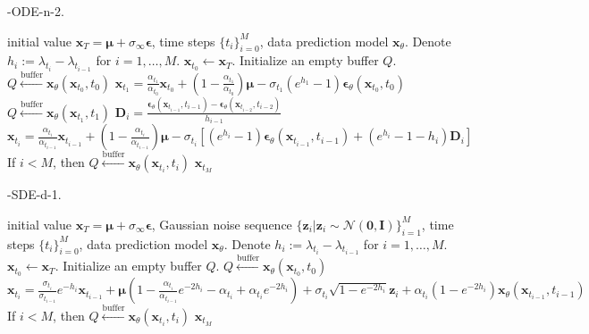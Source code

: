 \begin{algorithm}[H]
    \centering
    \caption{\ourmethod-ODE-n-2.}\label{alg:ode-n-2}
    \begin{algorithmic}[1]
    \REQUIRE initial value $\boldsymbol{x}_T=\boldsymbol\mu+\sigma_\infty\boldsymbol\epsilon$, time steps $\{t_i\}_{i=0}^M$, data prediction model $\boldsymbol{x}_\theta$. Denote $h_i:=\lambda_{t_i}-\lambda_{t_{i-1}}$ for $i=1,\ldots,M$.
        \STATE $\boldsymbol{x}_{t_0}\leftarrow\boldsymbol{x}_T$. Initialize an empty buffer $Q$.
        \STATE $Q\xleftarrow{\text{buffer}}\boldsymbol{x}_\theta(\boldsymbol{x}_{t_0},t_0)$
        \STATE $\boldsymbol{x}_{t_1}=\frac{\alpha_{t_1}}{\alpha_{t_{0}}}\boldsymbol{x}_{t_0}
        +\left(1-\frac{\alpha_{t_1}}{\alpha_{t_{0}}}\right)\boldsymbol{\mu}-\sigma_{t_1}(e^{h_1}-1)\boldsymbol{\epsilon}_\theta(\boldsymbol{x}_{t_0},t_0)$
        \STATE $Q\xleftarrow{\text{buffer}}\boldsymbol{x}_\theta(\boldsymbol{x}_{t_1},t_1)$
        \STATE $\boldsymbol{D}_i=\frac{\boldsymbol{\epsilon}_\theta(\boldsymbol{x}_{t_{i-1}},t_{i-1})-\boldsymbol{\epsilon}_\theta(\boldsymbol{x}_{t_{i-2}},t_{i-2})}{h_{i-1}}$
        \STATE $\boldsymbol{x}_{t_{i}}=\frac{\alpha_{t_i}}{\alpha_{t_{i-1}}}\boldsymbol{x}_{t_{i-1}}
        +\left(1-\frac{\alpha_{t_i}}{\alpha_{t_{i-1}}}\right)\boldsymbol{\mu}-\sigma_{t_i}\left[(e^{h_i}-1)\boldsymbol{\epsilon}_\theta(\boldsymbol{x}_{t_{i-1}},t_{i-1})+(e^{h_i}-1-h_i)\boldsymbol{D}_i \right]$
        \STATE If $i < M$, then $Q \xleftarrow{\text{buffer}} \boldsymbol{x}_\theta(\boldsymbol{x}_{t_i}, t_i)$
        \ENDFOR
        \RETURN $\boldsymbol{x}_{t_M}$
    \end{algorithmic}
\end{algorithm}

\begin{algorithm}[H]
    \centering
    \caption{\ourmethod-SDE-d-1.}\label{alg:sde-d-1}
    \begin{algorithmic}[1]
    \REQUIRE initial value $\boldsymbol{x}_T=\boldsymbol\mu+\sigma_\infty\boldsymbol\epsilon$, Gaussian noise sequence $\{\boldsymbol{z}_i|\boldsymbol{z}_i\sim\mathcal{N}(\boldsymbol{0}, \boldsymbol{I})\}_{i=1}^M$, time steps $\{t_i\}_{i=0}^M$, data prediction model $\boldsymbol{x}_\theta$. Denote $h_i:=\lambda_{t_i}-\lambda_{t_{i-1}}$ for $i=1,\ldots,M$.
        \STATE $\boldsymbol{x}_{t_0}\leftarrow\boldsymbol{x}_T$. Initialize an empty buffer $Q$.
        \STATE $Q\xleftarrow{\text{buffer}}\boldsymbol{x}_\theta(\boldsymbol{x}_{t_0},t_0)$
        \STATE $\boldsymbol{x}_{t_i}=\frac{\sigma_{t_i}}{\sigma_{t_{i-1}}}e^{-h_i}\boldsymbol{x}_{t_{i-1}}
        +\boldsymbol\mu\left(1-\frac{\alpha_{t_i}}{\alpha_{t_{i-1}}}e^{-2h_i}-\alpha_{t_i}+\alpha_{t_i}e^{-2h_i}\right)+\sigma_{t_i}\sqrt{1-e^{-2h_i}}\boldsymbol{z}_i
        +\alpha_{t_i}\left(1-e^{-2h_i}\right)\boldsymbol{x}_\theta(\boldsymbol{x}_{t_{i-1}},t_{i-1})$
        \STATE If $i < M$, then $Q \xleftarrow{\text{buffer}} \boldsymbol{x}_\theta(\boldsymbol{x}_{t_i}, t_i)$
        \ENDFOR
        \RETURN $\boldsymbol{x}_{t_M}$
    \end{algorithmic}
\end{algorithm}

